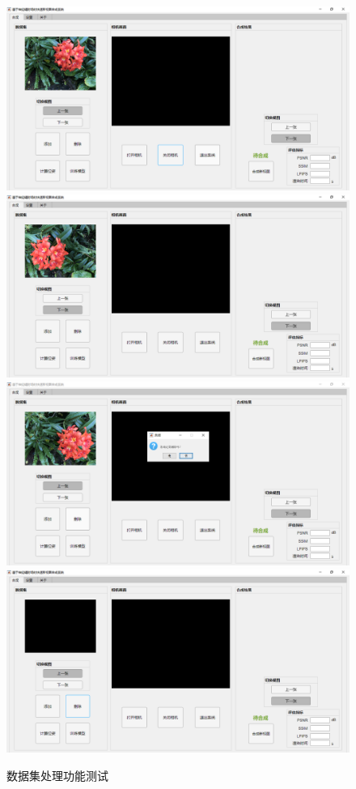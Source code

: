 \begin{figure}[thbp]
  \centering
    {\includegraphics[width=0.55\linewidth]{figures/system/2-a.png}}
    {\includegraphics[width=0.55\linewidth]{figures/system/2-b.png}}
    {\includegraphics[width=0.55\linewidth]{figures/system/2-c.png}}
    {\includegraphics[width=0.55\linewidth]{figures/system/2-d.png}}
  \caption{数据集处理功能测试}
  \label{fig:datasetProcess}
\end{figure}

